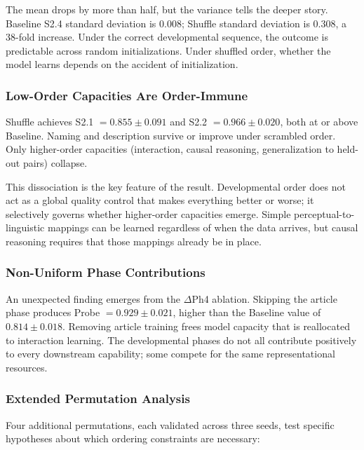 \documentclass{article}
\begin{document}
The mean drops by more than half, but the variance tells the deeper story. Baseline S2.4 standard deviation is 0.008; Shuffle standard deviation is 0.308, a 38-fold increase. Under the correct developmental sequence, the outcome is predictable across random initializations. Under shuffled order, whether the model learns depends on the accident of initialization.

\subsubsection{Low-Order Capacities Are Order-Immune}

Shuffle achieves S2.1 $= 0.855 \pm 0.091$ and S2.2 $= 0.966 \pm 0.020$, both at or above Baseline. Naming and description survive or improve under scrambled order. Only higher-order capacities (interaction, causal reasoning, generalization to held-out pairs) collapse.

This dissociation is the key feature of the result. Developmental order does not act as a global quality control that makes everything better or worse; it selectively governs whether higher-order capacities emerge. Simple perceptual-to-linguistic mappings can be learned regardless of when the data arrives, but causal reasoning requires that those mappings already be in place.

\subsubsection{Non-Uniform Phase Contributions}

An unexpected finding emerges from the $\Delta$Ph4 ablation. Skipping the article phase produces Probe $= 0.929 \pm 0.021$, higher than the Baseline value of $0.814 \pm 0.018$. Removing article training frees model capacity that is reallocated to interaction learning. The developmental phases do not all contribute positively to every downstream capability; some compete for the same representational resources.

\subsubsection{Extended Permutation Analysis}

Four additional permutations, each validated across three seeds, test specific hypotheses about which ordering constraints are necessary:
\end{document}
